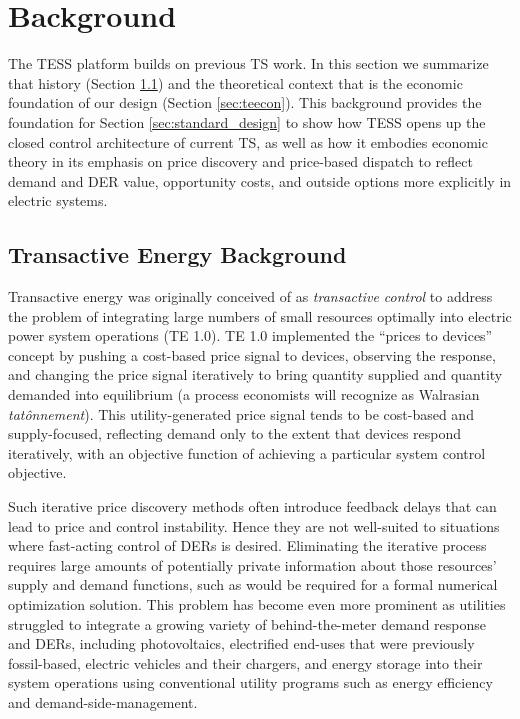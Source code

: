 \section{Background}\label{sec:background}

The TESS platform builds on previous TS work. In this section we summarize that history (Section \ref{sec:tehistory}) and the theoretical context that is the economic foundation of our design (Section \ref{sec:teecon}).
This background provides the foundation for Section \ref{sec:standard_design} to show how TESS opens up the closed control architecture of current TS, as well as how it embodies economic theory in its emphasis on price discovery and price-based dispatch to reflect demand and DER value, opportunity costs, and outside options more explicitly in electric systems.

\subsection{Transactive Energy Background}\label{sec:tehistory} 

Transactive energy was originally conceived of as \emph{transactive control} to address the problem of integrating large numbers of small resources optimally into electric power system operations (TE 1.0).
TE 1.0 implemented the ``prices to devices'' concept by pushing a cost-based price signal to devices, observing the response, and changing the price signal iteratively to bring quantity supplied and quantity demanded into equilibrium (a process economists will recognize as Walrasian \emph{tat\^{o}nnement}). This utility-generated price signal tends to be cost-based and supply-focused, reflecting demand only to the extent that devices respond iteratively, with an objective function of achieving a particular system control objective.

Such iterative price discovery methods often introduce feedback delays that can lead to price and control instability. Hence they are not well-suited to situations where fast-acting control of DERs is desired.
Eliminating the iterative process requires large amounts of potentially private information about those resources' supply and demand functions, such as would be required for a formal numerical optimization solution. This problem has become even more prominent as utilities struggled to integrate a growing variety of behind-the-meter demand response and DERs, including photovoltaics, electrified end-uses that were previously fossil-based, electric vehicles and their chargers, and energy storage into their system operations using conventional utility programs such as energy efficiency and demand-side-management. 

